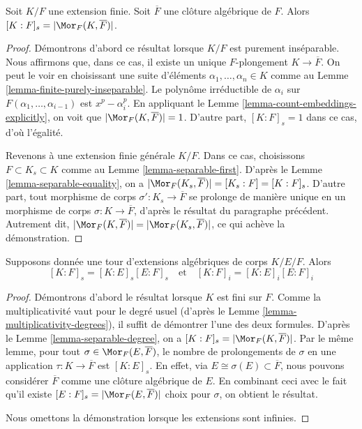 \begin{lemma}
\label{lemma-separable-degree}
Soit $K/F$ une extension finie. Soit $\overline{F}$ une clôture algébrique
de $F$. Alors $[K : F]_s = |\Mor_F(K, \overline{F})|$.
\end{lemma}

\begin{proof}
Démontrons d'abord ce résultat lorsque $K/F$ est purement inséparable. Nous affirmons
que, dans ce cas, il existe un unique $F$-plongement $K \to \overline{F}$. On peut le
voir en choisissant une suite d'éléments $\alpha_1, \ldots, \alpha_n \in K$
comme au Lemme \ref{lemma-finite-purely-inseparable}. Le polynôme irréductible
de $\alpha_i$ sur $F(\alpha_1, \ldots, \alpha_{i - 1})$ est $x^p - \alpha_i^p$.
En appliquant le Lemme \ref{lemma-count-embeddings-explicitly}, on voit que
$|\Mor_F(K, \overline{F})| = 1$. D'autre part, $[K : F]_s = 1$
dans ce cas, d'où l'égalité.

\medskip\noindent
Revenons à une extension finie générale $K/F$. Dans ce cas,
choisissons $F \subset K_s \subset K$ comme au Lemme \ref{lemma-separable-first}.
D'après le Lemme \ref{lemma-separable-equality}, on a
$|\Mor_F(K_s, \overline{F})| = [K_s : F] = [K : F]_s$.
D'autre part, tout morphisme de corps $\sigma' : K_s \to \overline{F}$
se prolonge de manière unique en un morphisme de corps $\sigma : K \to \overline{F}$, d'après le
résultat du paragraphe précédent. Autrement dit,
$|\Mor_F(K, \overline{F})| = |\Mor_F(K_s, \overline{F})|$,
ce qui achève la démonstration.
\end{proof}

\begin{lemma}[Multiplicativité]
\label{lemma-multiplicativity-all-degrees}
Supposons donnée une tour d'extensions algébriques de corps $K/E/F$. Alors
$$
[K : F]_s = [K : E]_s [E : F]_s
\quad\text{et}\quad
[K : F]_i = [K : E]_i [E : F]_i
$$
\end{lemma}

\begin{proof}
Démontrons d'abord le résultat lorsque $K$ est fini sur $F$. Comme la
multiplicativité vaut pour le degré usuel (d'après le
Lemme \ref{lemma-multiplicativity-degrees}), il suffit de démontrer
l'une des deux formules. D'après le Lemme \ref{lemma-separable-degree}, on a
$[K : F]_s = |\Mor_F(K, \overline{F})|$. Par le même lemme,
pour tout $\sigma \in \Mor_F(E, \overline{F})$, le nombre de prolongements
de $\sigma$ en une application $\tau : K \to \overline{F}$ est $[K : E]_s$.
En effet, via $E \cong \sigma(E) \subset \overline{F}$, nous pouvons considérer
$\overline{F}$ comme une clôture algébrique de $E$. En combinant ceci avec le
fait qu'il existe $[E : F]_s = |\Mor_F(E, \overline{F})|$ choix
pour $\sigma$, on obtient le résultat.

\medskip\noindent
Nous omettons la démonstration lorsque les extensions sont infinies.
\end{proof}









